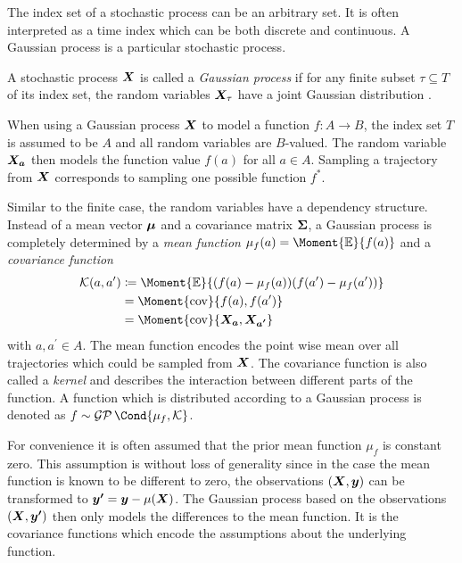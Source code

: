 The index set of a stochastic process can be an arbitrary set.
It is often interpreted as a time index which can be both discrete and continuous.
A Gaussian process is a particular stochastic process.
\begin{definition}
    \label{def:gaussian_process}
    A stochastic process $\bm{X}$ is called a \emph{Gaussian process} if for any finite subset $\tau \subseteq T$ of its index set, the random variables $\bm{X}_\tau$ have a joint Gaussian distribution \cite{astrom_introduction_1971}.
\end{definition}
When using a Gaussian process $\bm{X}$ to model a function $f : A \to B$, the index set $T$ is assumed to be $A$ and all random variables are $B$-valued.
The random variable $\bm{X_a}$ then models the function value $f(a)$ for all $a \in A$.
Sampling a trajectory from $\bm{X}$ corresponds to sampling one possible function $f^\ast$.

Similar to the finite case, the random variables have a dependency structure.
Instead of a mean vector $\bm{\mu}$ and a covariance matrix $\bm{\Sigma}$, a Gaussian process is completely determined by a \emph{mean function} $\mu_f(a) = \Moment{\E}{f(a)}$ and a \emph{covariance function}
\begin{align}
    \K(a, a^\prime) &\coloneqq \Moment{\E}{(f(a) - \mu_f(a))(f(a^\prime) - \mu_f(a^\prime))} \\
    &= \Moment{\cov}{f(a), f(a^\prime)} \\
    &= \Moment{\cov}{\rv{X_a}, \rv{X_{a^\prime}}}
\end{align}
with $a, a^\prime \in A$.
The mean function encodes the point wise mean over all trajectories which could be sampled from $\bm{X}$.
The covariance function is also called a \emph{kernel} and describes the interaction between different parts of the function.
A function which is distributed according to a Gaussian process is denoted as $f \sim \GP\Cond{\mu_f, \K}$.

For convenience it is often assumed that the prior mean function $\mu_f$ is constant zero.
This assumption is without loss of generality \cite{rasmussen_gaussian_2006} since in the case the mean function is known to be different to zero, the observations $\left( \bm{X}, \bm{y} \right)$ can be transformed to $\bm{y^\prime} = \bm{y} - \mu(\bm{X})$.
The Gaussian process based on the observations $\left( \bm{X}, \bm{y^\prime} \right)$ then only models the differences to the mean function.
It is the covariance functions which encode the assumptions about the underlying function.

